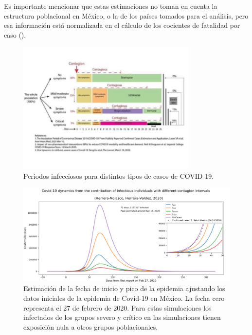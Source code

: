 \documentclass[8pt]{article}
\begin{document}
Es importante mencionar que estas estimaciones no toman en cuenta la estructura poblacional en México, o la de los países tomados para el análisis, pero esa información está normalizada en el cálculo de los cocientes de fatalidad por caso (). 


\begin{figure}[th!] \centering
\includegraphics[width=0.8\textwidth]{figures/InfectiousPeriods_NYCguidelines}
\caption{Periodos infecciosos para distintos tipos de casos de COVID-19.}\label{fig:dataNIW}

\end{figure}


\begin{figure}[h]
\includegraphics[width=\textwidth]{figures/dam_COVID19_Mexico_InitialFit_Herrera-Valdez+Herrera-Nolasco_2020}
\caption{Estimación de la fecha de inicio y pico de la epidemia ajustando los datos iniciales de la epidemia de Covid-19 en México. La fecha cero representa el 27 de febrero de 2020. Para estas simulaciones los infectados de los grupos severo y crítico en las simulaciones tienen exposición nula a otros grupos poblacionales. } \label{fig:inicioPicoNIW}
\end{figure}
\end{document}

